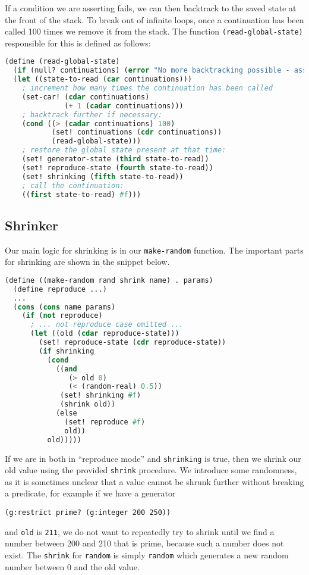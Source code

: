 If a condition we are asserting fails, we can then backtrack to the saved state at the front of the stack. To break out of infinite loops, once a continuation has been called 100 times we remove it from the stack. The function \verb|(read-global-state)| responsible for this is defined as follows:

\begin{lstlisting}[language=lisp]
(define (read-global-state)
  (if (null? continuations) (error "No more backtracking possible - assert could not be satisfied"))
  (let ((state-to-read (car continuations)))
    ; increment how many times the continuation has been called
    (set-car! (cdar continuations) 
              (+ 1 (cadar continuations)))
    ; backtrack further if necessary:
    (cond ((> (cadar continuations) 100)
           (set! continuations (cdr continuations))
           (read-global-state)))
    ; restore the global state present at that time:
    (set! generator-state (third state-to-read))
    (set! reproduce-state (fourth state-to-read))
    (set! shrinking (fifth state-to-read))
    ; call the continuation:
    ((first state-to-read) #f)))
\end{lstlisting}

\subsection{Shrinker}

Our main logic for shrinking is in our \verb|make-random| function. The important parts for shrinking are shown in the snippet below.

\begin{lstlisting}[language=lisp]
(define ((make-random rand shrink name) . params)
  (define reproduce ...)
  ...
  (cons (cons name params)
    (if (not reproduce)
      ; ... not reproduce case omitted ...
      (let ((old (cdar reproduce-state)))
        (set! reproduce-state (cdr reproduce-state))
        (if shrinking
          (cond
            ((and
               (> old 0)
               (< (random-real) 0.5))
             (set! shrinking #f)
             (shrink old))
            (else
              (set! reproduce #f)
              old))
          old)))))
\end{lstlisting}

If we are in both in ``reproduce mode'' and \verb|shrinking| is true, then we shrink our old value using the provided \verb|shrink| procedure. We introduce some randomness, as it is sometimes unclear that a value cannot be shrunk further without breaking a predicate, for example if we have a generator 
\begin{center}
\verb|(g:restrict prime? (g:integer 200 250))|
\end{center}
and \verb|old| is \verb|211|, we do not want to repeatedly try to shrink until we find a number between 200 and 210 that is prime, because such a number does not exist. The \verb|shrink| for \verb|random| is simply \verb|random| which generates a new random number between 0 and the old value.

